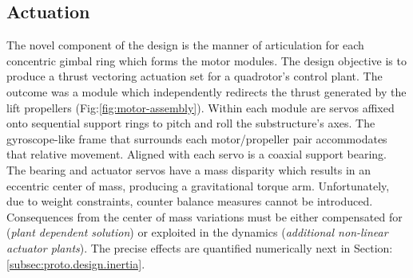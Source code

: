 \subsection{Actuation}
\label{subsec:proto.design.actuation}
The novel component of the design is the manner of articulation for each concentric gimbal ring which forms the motor modules. The design objective is to produce a thrust vectoring actuation set for a quadrotor's control plant. The outcome was a module which independently redirects the thrust generated by the lift propellers (Fig:\ref{fig:motor-assembly}). Within each module are servos affixed onto sequential support rings to pitch and roll the substructure's axes. The gyroscope-like frame that surrounds each motor/propeller pair accommodates that relative movement. Aligned with each servo is a coaxial support bearing. The bearing and actuator servos have a mass disparity which results in an eccentric center of mass, producing a gravitational torque arm. Unfortunately, due to weight constraints, counter balance measures cannot be introduced. Consequences from the center of mass variations must be either compensated for (\emph{plant dependent solution}) or exploited in the dynamics (\emph{additional non-linear actuator plants}). The precise effects are quantified numerically next in Section:\ref{subsec:proto.design.inertia}.
\par
